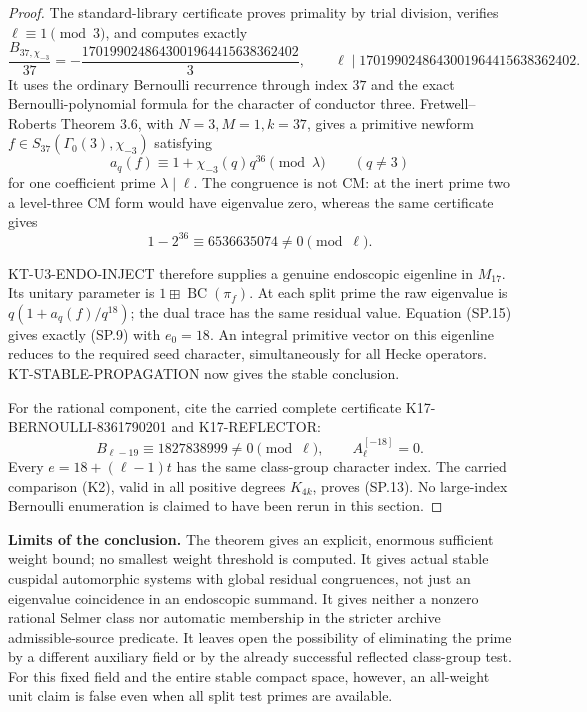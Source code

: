 \documentclass[11pt,a4paper]{article}
\theoremstyle{definition}
\renewcommand{\paragraph}[1]{\par\smallskip\noindent\textbf{#1}\quad\ignorespaces}
\begin{document}
\begin{proof}
The standard-library certificate
 proves primality
by trial division, verifies $\ell\equiv1\pmod3$, and
computes exactly
\[
 \frac{B_{37,\chi_{-3}}}{37}
       =-\frac{1701990248643001964415638362402}{3},
 \qquad
 \ell\mid1701990248643001964415638362402.
                                                               \tag{SP.14}
\]
It uses the ordinary Bernoulli recurrence through index
$37$ and the exact Bernoulli-polynomial formula for
the character of conductor three. Fretwell--Roberts
Theorem 3.6, with $N=3,M=1,k=37$, gives a primitive
newform $f\in S_{37}(\Gamma_0(3),\chi_{-3})$ satisfying
\[
              a_q(f)\equiv1+\chi_{-3}(q)q^{36}
                            \pmod\lambda
                         \qquad(q\ne3)
                                                               \tag{SP.15}
\]
for one coefficient prime $\lambda\mid\ell$.
The congruence is not CM: at the inert prime two a
level-three CM form would have eigenvalue zero, whereas
the same certificate gives
\[
                    1-2^{36}\equiv6536635074\ne0\pmod\ell.
                                                               \tag{SP.16}
\]

KT-U3-ENDO-INJECT therefore supplies a genuine endoscopic
eigenline in $M_{17}$. Its unitary parameter is
$1\boxplus\operatorname{BC}(\pi_f)$. At each split prime
the raw eigenvalue is $q(1+a_q(f)/q^{18})$; the dual
trace has the same residual value. Equation (SP.15)
gives exactly (SP.9) with $e_0=18$. An integral primitive
vector on this eigenline reduces to the required seed
character, simultaneously for all Hecke operators.
KT-STABLE-PROPAGATION now gives the stable conclusion.

For the rational component, cite the carried complete
certificate K17-BERNOULLI-8361790201 and K17-REFLECTOR:
\[
             B_{\ell-19}\equiv1827838999\ne0\pmod\ell,
             \qquad A_\ell^{[-18]}=0.
\]
Every $e=18+(\ell-1)t$ has the same class-group character
index. The carried comparison (K2), valid in all positive
degrees $K_{4k}$, proves (SP.13). No large-index Bernoulli
enumeration is claimed to have been rerun in this section.
\end{proof}

\paragraph{Limits of the conclusion.}
The theorem gives an explicit, enormous sufficient weight
bound; no smallest weight threshold is computed. It gives actual
stable cuspidal automorphic systems with global residual
congruences, not just an eigenvalue coincidence in an
endoscopic summand. It gives neither a nonzero rational
Selmer class nor automatic membership in the stricter
archive admissible-source predicate. It leaves open the
possibility of eliminating the prime by a different
auxiliary field or by the already successful reflected
class-group test. For this fixed field and the entire
stable compact space, however, an all-weight unit claim
is false even when all split test primes are available.
\end{document}
